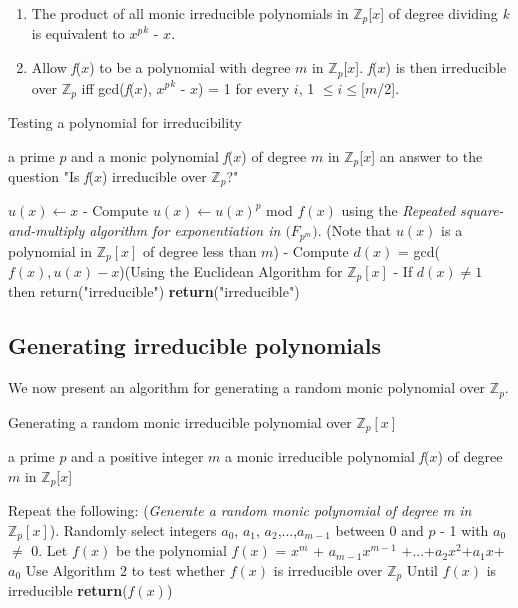 \documentclass[iwp,first]{luthesis}
\begin{document}
\begin{enumerate}

\item The product of all monic irreducible polynomials in $\mathbb{Z}_p$[$x$] of degree dividing \textit{k} is equivalent to ${\textit{x}^p}^k$ - $x$.

\item Allow \textit{f}($x$) to be a polynomial with degree $m$ in $\mathbb{Z}_p$[$x$]. \textit{f}($x$) is then irreducible over $\mathbb{Z}_p$ iff gcd(\textit{f}($x$), ${\textit{x}^p}^k$ - $x$) = 1 for every $i$, 1 $\leq$$i$$\leq$[$m$/2]. 

\end{enumerate}  

\begin{algorithm}
\caption{Testing a polynomial for irreducibility}
\begin{algorithmic}
\REQUIRE a prime $p$ and a monic polynomial \textit{f}($x$) of degree $m$ in $\mathbb{Z}_p$[$x$]
\ENSURE an answer to the question "Is \textit{f}($x$) irreducible over $\mathbb{Z}_p$?"
\begin{enumerate}
\STATE $u(x) \leftarrow x$ 
\STATE  - Compute $u(x) \leftarrow u(x)^p$ mod $f(x)$ using the \textit{Repeated square-and-multiply algorithm for exponentiation in $\mathbb({F}_{p^m})$}. (Note that $u(x)$ is a polynomial in $\mathbb{Z}_p[x]$ of degree less than $m$)
\STATE  - Compute $d(x)$ = gcd($f(x),u(x)-x$)(Using the Euclidean Algorithm for $\mathbb{Z}_p[x]$
\STATE  - If $d(x) \neq 1$ then return("irreducible")
\ENDFOR
\STATE \textbf{return}("irreducible")
\end{enumerate}
\end{algorithmic}
\end{algorithm}

\newpage 

\subsection{Generating irreducible polynomials}

We now present an algorithm for generating a random monic polynomial over $\mathbb{Z}_p$.

\begin{algorithm}
\caption{Generating a random monic irreducible polynomial over $\mathbb{Z}_p[x]$}
\begin{algorithmic}
\REQUIRE a prime $p$ and a positive integer $m$
\ENSURE a monic irreducible polynomial \textit{f}($x$) of degree $m$ in $\mathbb{Z}_p$[$x$]
\begin{enumerate}
\STATE Repeat the following:
\STATE (\textit{Generate a random monic polynomial of degree m in $\mathbb{Z}_p[x]$}). Randomly select integers $a_0$, $a_1$, $a_2$,...,$a_{m-1}$ between 0 and $p$ - 1 with $a_0$ $\neq$ 0. Let $f(x)$ be the polynomial $f(x)$ = $x^m$ + $a_{m-1}x^{m-1}$ +...+$a_{2}x^{2}$+$a_{1}x$+$a_0$
\STATE Use Algorithm 2 to test whether $f(x) $ is irreducible over $\mathbb{Z}_p$
\STATE Until $f(x)$ is irreducible 
\STATE \textbf{return}($f(x)$)
\end{enumerate}
\end{algorithmic}
\end{algorithm}
\end{document}
